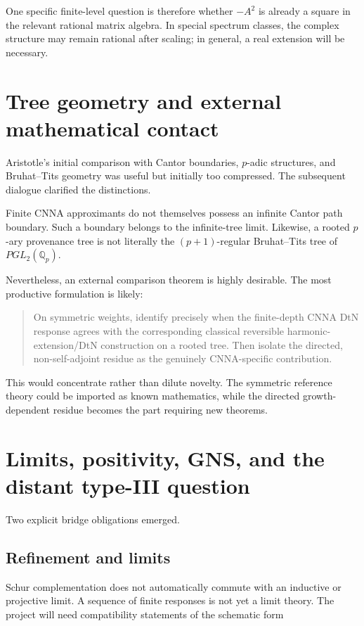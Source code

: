 \documentclass[11pt,a4paper]{article}
\begin{document}
One specific finite-level question is therefore whether $-A^{2}$ is already a square in the relevant rational matrix algebra. In special spectrum classes, the complex structure may remain rational after scaling; in general, a real extension will be necessary.

\section{Tree geometry and external mathematical contact}

Aristotle's initial comparison with Cantor boundaries, $p$-adic structures, and Bruhat--Tits geometry was useful but initially too compressed. The subsequent dialogue clarified the distinctions.

Finite CNNA approximants do not themselves possess an infinite Cantor path boundary. Such a boundary belongs to the infinite-tree limit. Likewise, a rooted $p$-ary provenance tree is not literally the $(p+1)$-regular Bruhat--Tits tree of $PGL_{2}(\mathbb Q_{p})$.

Nevertheless, an external comparison theorem is highly desirable. The most productive formulation is likely:

\begin{quote}
On symmetric weights, identify precisely when the finite-depth CNNA DtN response agrees with the corresponding classical reversible harmonic-extension/DtN construction on a rooted tree. Then isolate the directed, non-self-adjoint residue as the genuinely CNNA-specific contribution.
\end{quote}

This would concentrate rather than dilute novelty. The symmetric reference theory could be imported as known mathematics, while the directed growth-dependent residue becomes the part requiring new theorems.

\section{Limits, positivity, GNS, and the distant type-III question}

Two explicit bridge obligations emerged.

\subsection{Refinement and limits}

Schur complementation does not automatically commute with an inductive or projective limit. A sequence of finite responses is not yet a limit theory. The project will need compatibility statements of the schematic form
\end{document}
